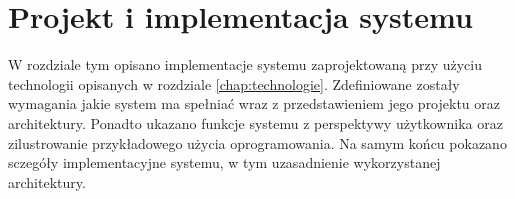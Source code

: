 \chapter{Projekt i implementacja systemu}
\label{sec:implementacja-systemu}
W rozdziale tym opisano implementacje systemu zaprojektowaną przy użyciu technologii opisanych w rozdziale \ref{chap:technologie}. Zdefiniowane zostały wymagania jakie system ma spełniać wraz z przedstawieniem jego projektu oraz architektury. Ponadto ukazano funkcje systemu z perspektywy użytkownika oraz zilustrowanie przykładowego użycia oprogramowania. Na samym końcu pokazano sczegóły implementacyjne systemu, w tym uzasadnienie wykorzystanej architektury. 





